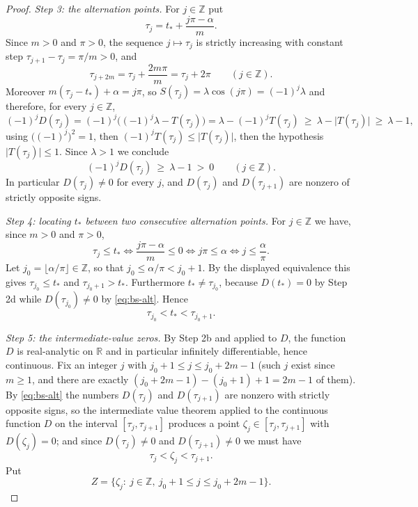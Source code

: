 \begin{proof}
\emph{Step 3: the alternation points.} For $j\in\mathbb{Z}$ put
\[
  \tau_j=t_*+\frac{j\pi-\alpha}{m} .
\]
Since $m>0$ and $\pi>0$, the sequence $j\mapsto\tau_j$ is strictly increasing
with constant step $\tau_{j+1}-\tau_j=\pi/m>0$, and
\begin{equation}\label{eq:bs-period}
  \tau_{j+2m}=\tau_j+\frac{2m\pi}{m}=\tau_j+2\pi
  \qquad(j\in\mathbb{Z}).
\end{equation}
Moreover $m(\tau_j-t_*)+\alpha=j\pi$, so $S(\tau_j)=\lambda\cos(j\pi)=(-1)^j\lambda$
and therefore, for every $j\in\mathbb{Z}$,
\[
  (-1)^jD(\tau_j)=(-1)^j\bigl((-1)^j\lambda-T(\tau_j)\bigr)
  =\lambda-(-1)^jT(\tau_j)
  \ \ge\ \lambda-\bigl\lvert T(\tau_j)\bigr\rvert
  \ \ge\ \lambda-1,
\]
using $\bigl((-1)^j\bigr)^2=1$, then $(-1)^jT(\tau_j)\le\lvert T(\tau_j)\rvert$,
then the hypothesis $\lvert T(\tau_j)\rvert\le1$. Since $\lambda>1$ we conclude
\begin{equation}\label{eq:bs-alt}
  (-1)^jD(\tau_j)\ \ge\ \lambda-1\ >\ 0
  \qquad(j\in\mathbb{Z}).
\end{equation}
In particular $D(\tau_j)\ne0$ for every $j$, and $D(\tau_j)$ and
$D(\tau_{j+1})$ are nonzero of strictly opposite signs.

\emph{Step 4: locating $t_*$ between two consecutive alternation points.} For
$j\in\mathbb{Z}$ we have, since $m>0$ and $\pi>0$,
\[
  \tau_j\le t_*
  \iff \frac{j\pi-\alpha}{m}\le0
  \iff j\pi\le\alpha
  \iff j\le\frac{\alpha}{\pi}.
\]
Let $j_0=\lfloor\alpha/\pi\rfloor\in\mathbb{Z}$, so that
$j_0\le\alpha/\pi<j_0+1$. By the displayed equivalence this gives
$\tau_{j_0}\le t_*$ and $\tau_{j_0+1}>t_*$. Furthermore $t_*\ne\tau_{j_0}$,
because $D(t_*)=0$ by Step 2d while $D(\tau_{j_0})\ne0$ by \eqref{eq:bs-alt}.
Hence
\begin{equation}\label{eq:bs-locate}
  \tau_{j_0}<t_*<\tau_{j_0+1}.
\end{equation}

\emph{Step 5: the intermediate-value zeros.} By Step 2b and
 applied to $D$, the function $D$ is real-analytic on
$\mathbb{R}$ and in particular infinitely differentiable, hence continuous. Fix an integer $j$ with
$j_0+1\le j\le j_0+2m-1$ (such $j$ exist since $m\ge1$, and there are exactly
$(j_0+2m-1)-(j_0+1)+1=2m-1$ of them). By \eqref{eq:bs-alt} the numbers
$D(\tau_j)$ and $D(\tau_{j+1})$ are nonzero with strictly opposite signs, so the
intermediate value theorem applied to the continuous function $D$ on the
interval $[\tau_j,\tau_{j+1}]$ produces a point $\zeta_j\in[\tau_j,\tau_{j+1}]$
with $D(\zeta_j)=0$; and since $D(\tau_j)\ne0$ and $D(\tau_{j+1})\ne0$ we must
have
\begin{equation}\label{eq:bs-zero}
  \tau_j<\zeta_j<\tau_{j+1}.
\end{equation}
Put
\[
  Z=\bigl\{\zeta_j:\ j\in\mathbb{Z},\ j_0+1\le j\le j_0+2m-1\bigr\}.
\]


\end{proof}
